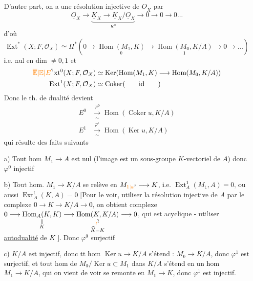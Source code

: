 D'autre part, on a une résolution injective de $\underline O_X$ par
\[
 \underline O_X\longrightarrow\underbrace{\underline K_X\longrightarrow\underline K_X/\underline O_X}_{K^\bullet}\longrightarrow0\longrightarrow0\longrightarrow0\ldots
\]
d'où
\[
 \operatorname{Ext}^{*}(X;F,\mathcal O_X)\simeq H^{*}(0\longrightarrow
 \underset{0}{\operatorname{Hom}(M_1,K)}\longrightarrow\underset{1}{\operatorname{Hom}(M_0,K/A)}
 \longrightarrow0\longrightarrow\ldots)
\]
i.e. nul en dim $\ne0,1$ et
\[
\begin{aligned}
 \unsure{\overline{\mathbb E}|\mathbb E|E}\mathrm{xt}^0(X;F,\mathcal O_X)&\simeq\operatorname{Ker}(\operatorname{Hom}(M_1,K)\longrightarrow\operatorname{Hom}(M_0,K/A))\\
 \operatorname{Ext}^1(X;F,\mathcal O_X)&\simeq\operatorname{Coker}(\qquad\mathrm{id}\qquad)
\end{aligned}
\]
Donc le th. de dualité devient
\[
\begin{aligned}
 E^0&\xrightarrow[\sim]{\varphi^0}\operatorname{Hom}(\operatorname{Coker}u,K/A)\\
 E^1&\xrightarrow[\sim]{\varphi^1}\operatorname{Hom}(\operatorname{Ker}u,K/A)
\end{aligned}
\]
qui résulte des faits suivants

a) Tout hom $M_1\longrightarrow A$ est nul (l'image est un sous-groupe $K$-vectoriel de $A$) donc $\varphi^0$ injectif

b) Tout hom. $M_1\longrightarrow K/A$ se relève en $M_{\unsure{1|a}}\longrightarrow K$, i.e. $\operatorname{Ext}^1_A(M_1,A)=0$, ou aussi \uline{$\operatorname{Ext}^1_A(K,A)=0$} [Pour le voir, utiliser la résolution injective  de $A$ par le complexe $0\longrightarrow K\longrightarrow K/A\longrightarrow0$, on obtient  complexe $0\longrightarrow\underset{\substack{\|\\K}}{\operatorname{Hom}_A(K,K)}\longrightarrow\underset{\substack{\unsure{\wr}\\\widehat K=K}}{\operatorname{Hom}(K,K/A)}\longrightarrow0$, qui est acyclique - utiliser \uline{autodualité} de $K$   ]. Donc $\varphi^0$ surjectif

c) $K/A$ est injectif, donc tt hom $\operatorname{Ker}u\longrightarrow K/A$ s'étend : $M_0\longrightarrow K/A$, donc $\varphi^1$ est surjectif, et tout hom de $M_0/\operatorname{Ker}u\subset M_1$ dans $K/A$ s'étend en un hom $M_1\longrightarrow K/A$, qui on vient de voir se remonte en $M_1\longrightarrow K$, donc $\varphi^1$ est injectif.

